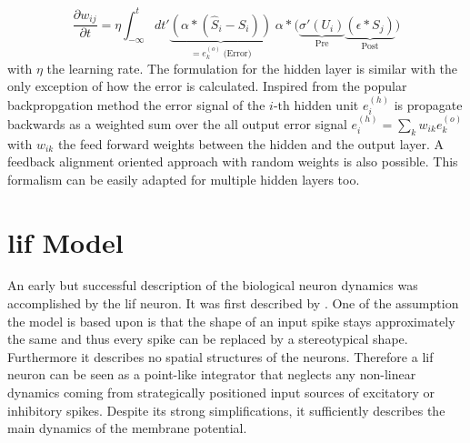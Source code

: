 \begin{equation}
\label{superspikeweightupdateeq}
\frac{\partial w_{ij}}{\partial t} = \eta \int_{-\infty}^{t} dt'
\underbrace{\left(\alpha \ast (\hat{S}_i - S_i)\right)}_{= e^{(o)}_k \; \text{(Error)}} 
\; \alpha \ast 
\Big(\underbrace{\sigma'(U_i)}_{\text{Pre}} 
\underbrace{\left(\epsilon \ast S_j\right)}_{\text{Post}}\Big)
\end{equation}
with $\eta$ the learning rate. The formulation for the hidden layer is similar with the only exception of how the error is calculated. Inspired from the popular backpropgation method the error signal of the $i \text{-th}$ hidden unit $e^{(h)}_i$ is propagate backwards as a weighted sum over the all output error signal $e^{(h)}_i = \sum_{k} w_{ik} e^{(o)}_k$ with $w_{ik}$ the feed forward weights between the hidden and the output layer. A feedback alignment oriented approach with random weights is also possible. This formalism can be easily adapted for multiple hidden layers too.


%



\section{\gls{lif} Model}

An early but successful description of the biological neuron dynamics was accomplished by the \gls{lif} neuron. It was first described by \cite{lapicque1907recherches}. One of the assumption the model is based upon is that the shape of an input spike stays approximately the same and thus every spike can be replaced by a stereotypical shape. Furthermore it describes no spatial structures of the neurons. Therefore a \gls{lif} neuron can be seen as a point-like integrator that neglects any non-linear dynamics coming from strategically positioned input sources of excitatory or inhibitory spikes. Despite its strong simplifications, it sufficiently describes the main dynamics of the membrane potential. 

